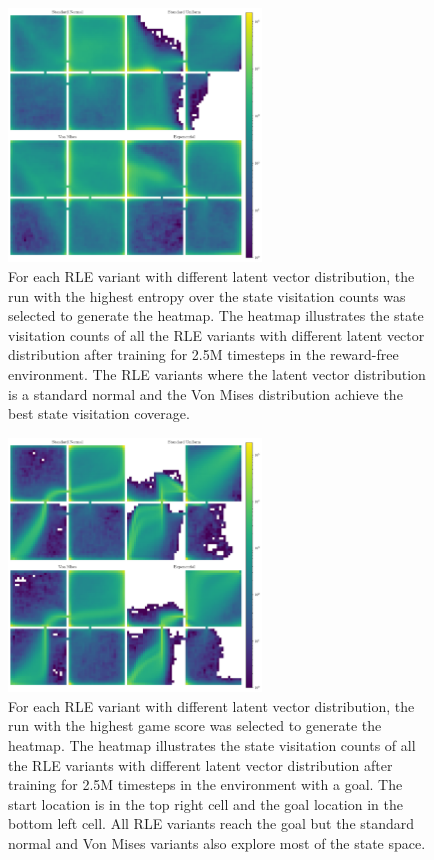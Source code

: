 \begin{figure}[h!]
  \centering
  \includegraphics[width=0.6\textwidth]{figures/gridworld_heatmaps_no_goal_distributions.pdf}
  \caption{For each RLE variant with different latent vector distribution, the run with the highest entropy over the state visitation counts was selected to generate the heatmap. The heatmap illustrates the state visitation counts of all the RLE variants with different latent vector distribution after training for 2.5M timesteps in the reward-free environment. The RLE variants where the latent vector distribution is a standard normal and the Von Mises distribution achieve the best state visitation coverage.}
  \label{fig:gridworld-heatmap-nogoal-distributions}
\end{figure}

\begin{figure}[h!]
  \centering
  \includegraphics[width=0.6\textwidth]{figures/gridworld_heatmaps_goal_distributions.pdf}
  \caption{For each RLE variant with different latent vector distribution, the run with the highest game score was selected to generate the heatmap. The heatmap illustrates the state visitation counts of all the RLE variants with different latent vector distribution after training for 2.5M timesteps in the environment with a goal. The start location is in the top right cell and the goal location in the bottom left cell. All RLE variants reach the goal but the standard normal and Von Mises variants also explore most of the state space.}
  \label{fig:gridworld-heatmap-goal-distributions}
\end{figure}

